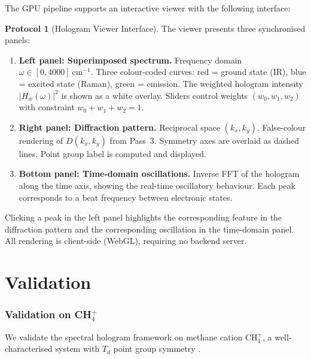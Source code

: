 \documentclass[11pt,a4paper]{article}
\theoremstyle{definition}
\newtheorem{protocol}[theorem]{Protocol}
\theoremstyle{remark}
\begin{document}
The GPU pipeline supports an interactive viewer with the following interface:

\begin{protocol}[Hologram Viewer Interface]
\label{prot:viewer}
The viewer presents three synchronised panels:
\begin{enumerate}[label=(\alph*)]
  \item \textbf{Left panel: Superimposed spectrum.} Frequency domain $\omega \in [0, 4000]~\mathrm{cm}^{-1}$. Three colour-coded curves: red = ground state (IR), blue = excited state (Raman), green = emission. The weighted hologram intensity $|H_w(\omega)|^2$ is shown as a white overlay. Sliders control weights $(w_0, w_1, w_2)$ with constraint $w_0 + w_1 + w_2 = 1$.
  \item \textbf{Right panel: Diffraction pattern.} Reciprocal space $(k_x, k_y)$. False-colour rendering of $D(k_x, k_y)$ from Pass~3. Symmetry axes are overlaid as dashed lines. Point group label is computed and displayed.
  \item \textbf{Bottom panel: Time-domain oscillations.} Inverse FFT of the hologram along the time axis, showing the real-time oscillatory behaviour. Each peak corresponds to a beat frequency between electronic states.
\end{enumerate}
Clicking a peak in the left panel highlights the corresponding feature in the diffraction pattern and the corresponding oscillation in the time-domain panel. All rendering is client-side (WebGL), requiring no backend server.
\end{protocol}


\part{Validation}

\section{Validation on CH$_4^+$}
\label{sec:ch4}

We validate the spectral hologram framework on methane cation CH$_4^+$, a well-characterised system with $T_d$ point group symmetry \citep{oka1980}.
\end{document}
